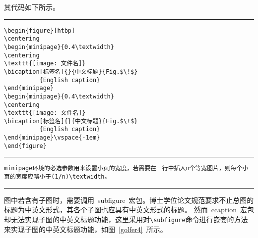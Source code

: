 其代码如下所示。
\vspace{1em}\noindent\hrule
\begin{lstlisting}
\begin{figure}[htbp]
\centering
\begin{minipage}{0.4\textwidth}
\centering
\texttt{[image: 文件名]}
\bicaption[标签名]{}{中文标题}{Fig.$\!$}
          {English caption}
\end{minipage}
\begin{minipage}{0.4\textwidth}
\centering
\texttt{[image: 文件名]}
\bicaption[标签名]{}{中文标题}{Fig.$\!$}
          {English caption}
\end{minipage}\vspace{-1em}
\end{figure}
\end{lstlisting}
\noindent\hrule
\begin{lstlisting}
minipage环境的必选参数用来设置小页的宽度，若需要在一行中插入n个等宽图片，则每个小页的宽度应略小于(1/n)\textwidth。
\end{lstlisting}
\noindent\hrule


图中若含有子图时，需要调用~subfigure~宏包。博士学位论文规范要求不止总图的标题为中英文形式，其各个子图也应具有中英文形式的标题。
然而~ccaption~宏包却无法实现子图的中英文标题功能，这里采用对\verb|\subfigure|命令进行嵌套的方法来实现子图的中英文标题功能，如图~\ref{golfer4}~所示。

\begin{figure}[htbp]
\centering
\subfigure{\label{golfer41}}\addtocounter{subfigure}{-2}
\subfigure{\label{golfer42}}\addtocounter{subfigure}{-2}
\vspace{-1em}
\end{figure}

